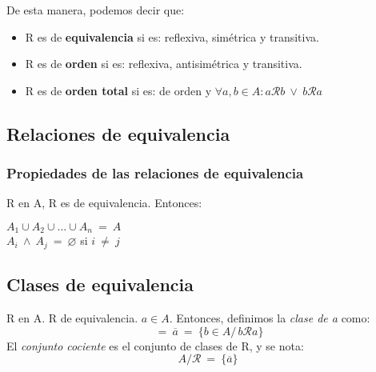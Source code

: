 \documentclass{article}
\newcommand{\lands}{\:\land\:}                          %
\newcommand{\tq}{/\,}                                   %
\newcommand{\vees}{\:\vee\:}                            %
\newcommand{\eq}{\:=\:}                                 %
\newcommand{\neqs}{\:\neq\:}                            %
\newcommand{\relates}{\mathcal{R}}                      %
\begin{document}
De esta manera, podemos decir que:
\begin{itemize}
    \item R es de \textbf{equivalencia} si es: reflexiva, simétrica y transitiva.
    \item R es de \textbf{orden} si es: reflexiva, antisimétrica y transitiva.
    \item R es de \textbf{orden total} si es: de orden y $\forall a,b \in A: a \relates b \vees b \relates a$
\end{itemize}

\subsection{Relaciones de equivalencia}
\subsubsection{Propiedades de las relaciones de equivalencia}
R en A, R es de equivalencia. Entonces:
\begin{center}
 $A_1 \cup A_2 \cup ... \cup A_n \eq A$
\\ $A_i \lands A_j \eq \varnothing$ si $i \neqs j$
\end{center}
\subsection*{Clases de equivalencia}
R en A. R de equivalencia. $a \in A$. Entonces, definimos la \emph{clase de a} como:
\begin{equation*}
    [a] \eq \overline{a} \eq \{b \in A \tq b \relates a \}
\end{equation*}
El \emph{conjunto cociente} es el conjunto de clases de R, y se nota:
\begin{equation*}
    A/\relates \eq \{ \overline{a} \}
\end{equation*}
\end{document}
